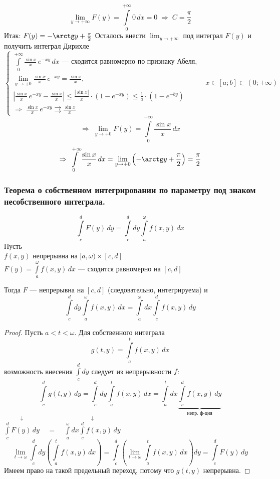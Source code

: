 \begin{example}
    \[ \lim_{y \to +\infty} F(y) = \int\limits_0^{+\infty} 0\,dx = 0 \;\Rightarrow\; C = \frac{\pi}2 \]
    Итак: $F(y) = -\arctg y + \frac{\pi}2$
    Осталось внести $\lim_{y \to +\infty}$ под интеграл $F(y)$ и получить интеграл Дирихле
    \[ \left\{\begin{array}{l} 
    \int\limits_0^{+\infty} \frac{\sin x}x\,e^{-xy}\,dx \text{ --- сходится равномерно по признаку Абеля}, \\
    \lim_{y \to +0} \frac{\sin x}x\,e^{-xy} = \frac{\sin x}x, \\
    \left| \frac{\sin x}x\,e^{-xy} - \frac{\sin x}x \right| \le \frac{|\sin x|}x \cdot \left( 1 - e^{-xy} \right) \le 
    \frac1a \cdot \left( 1 - e^{-by} \right) \\
    \Rightarrow\; \frac{\sin x}x\,e^{-xy} \rightrightarrows \frac{\sin x}x
    \end{array}\right. \ \ \ x \in [a; b] \subset (0; +\infty) \]
    \[ \Rightarrow\; \lim_{y \to +0} F(y) = \int\limits_0^{+\infty} \frac{\sin x}x\,dx \]
    \[ \Rightarrow\; \int\limits_0^{+\infty} \frac{\sin x}x\,dx = 
    \lim_{y \to +0} \left( -\arctg y + \frac{\pi}2 \right) = \frac{\pi}2 \]
\end{example}

\subsubsection{ Теорема о собственном интегрировании по параметру под знаком несобственного интеграла.}
\label{subsubsec:6.2}
\[ \int\limits_c^d F(y)\,dy = \int\limits_c^d dy \int\limits_a^{\omega} f(x, y)\,dx \]
Пусть \\
\phantom{Пусть} $f(x, y)$ непрерывна на $[a, \omega) \times [c, d]$ \\
\phantom{Пусть} $F(y) = \int\limits_a^{\omega} f(x, y)\,dx$ --- сходится равномерно на $[c, d]$

Тогда $F$ --- непрерывна на $[c, d]$ (следовательно, интегрируема) и 
\[ \int\limits_c^d dy \int\limits_a^{\omega} f(x, y)\,dx = \int\limits_a^{\omega} dx \int\limits_c^d f(x, y)\,dy \]
\begin{proof}
    Пусть $a < t < \omega$. Для собственного интеграла 
    \[ g(t, y) = \int\limits_a^t f(x, y)\,dx \]
    возможность внесения $\int\limits_c^d dy$ следует из непрерывности $f$:
    \[ \int\limits_c^d g(t, y)\,dy = \int\limits_c^d dy \int\limits_a^t f(x, y)\,dx = 
    \int\limits_a^t dx \underset{\text{непр. ф-ция}}{\underbrace{\int\limits_c^d f(x, y)\,dy}} \]
    \phantom{$\int\limits_c^d g(t, y)\,dy =\ \ \ \ \ $} $\overset{\downarrow}{\int\limits_c^d F(y)\,dy} \ \ \ \ \ = \ \ \ \ \ 
    \overset{\downarrow}{\int\limits_a^{\omega} dx \int\limits_c^d f(x, y)\,dy}$
    \[ \lim_{t \to \omega}\int\limits_c^d  dy \left( \int\limits_a^t f(x, y)\,dx \right) = 
    \int\limits_c^d \left( \lim_{t \to \omega} \int\limits_a^t f(x, y)\,dx \right) dy = \int\limits_c^d F(y)\,dy \]
    Имеем право на такой предельный переход, потому что $g(t, y)$ непрерывна.
\end{proof}

